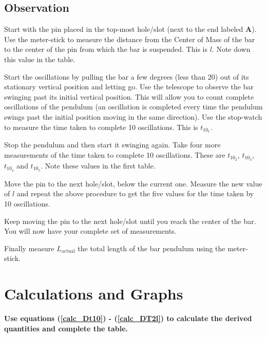 \documentclass{article}
\begin{document}
      \subsection*{Observation}

      Start with the pin placed in the top-most hole/slot (next to the end labeled \textbf{A}). Use the meter-stick to measure the distance from the Center of Mass of the bar to the center of the pin from which the bar is suspended. This is $l$. Note down this value in the table.

      Start the oscillations by pulling the bar a few degrees (less than 20) out of its stationary vertical position and letting go. Use the telescope to observe the bar swinging past its initial vertical position. This will allow you to count complete oscillations of the pendulum (an oscillation is completed every time the pendulum swings past the initial position moving in the same direction). Use the stop-watch to measure the time taken to complete 10 oscillations. This is $t_{10_1}$.

      Stop the pendulum and then start it swinging again. Take four more measurements of the time taken to complete 10 oscillations. These are $t_{10_2}$, $t_{10_3}$, $t_{10_4}$ and $t_{10_5}$. Note these values in the first table.

      Move the pin to the next hole/slot, below the current one. Measure the new value of $l$ and repeat the above procedure to get the five values for the time taken by 10 oscillations.

      Keep moving the pin to the next hole/slot until you reach the center of the bar. You will now have your complete set of measurements.

      Finally measure $L_\text{actual}$ the total length of the bar pendulum using the meter-stick.


   \section*{Calculations and Graphs}

      \textbf{Use equations (\ref{calc_Dt10}) - (\ref{calc_DT2l}) to calculate the derived quantities and complete the table.}\\
\end{document}
